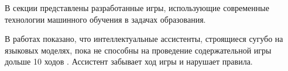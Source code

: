В секции представлены разработанные игры, использующие современные технологии машинного обучения в задачах образования.




В работах показано, что интеллектуальные ассистенты, строящиеся сугубо на языковых моделях, пока не способны на проведение содержательной игры дольше 10 ходов
. Ассистент забывает ход игры и нарушает правила.

